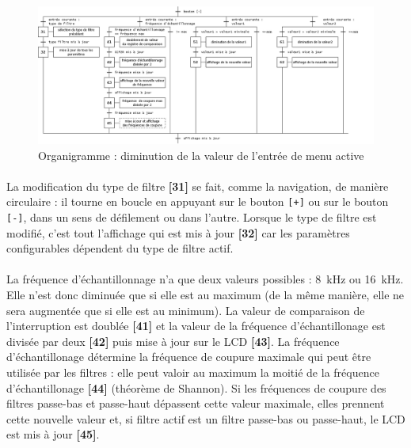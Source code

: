 \documentclass{article}
\begin{document}
    \begin{figure}[H]
        \centering
        \includegraphics[width=\textwidth]{./images/orga_decrease.png}
        \caption{Organigramme : diminution de la valeur de l'entrée de menu active}
    \end{figure}

    \paragraph{}
    La modification du type de filtre \textbf{[31]} se fait, comme la navigation, de manière circulaire : il tourne en boucle en appuyant sur le bouton \texttt{[+]} ou sur le bouton \texttt{[-]}, dans un sens de défilement ou dans l'autre. Lorsque le type de filtre est modifié, c'est tout l'affichage qui est mis à jour \textbf{[32]} car les paramètres configurables dépendent du type de filtre actif.

    \paragraph{}
    La fréquence d'échantillonnage n'a que deux valeurs possibles : \SI{8}{\kilo\hertz} ou \SI{16}{\kilo\hertz}. Elle n'est donc diminuée que si elle est au maximum (de la même manière, elle ne sera augmentée que si elle est au minimum). La valeur de comparaison de l'interruption est doublée \textbf{[41]} et la valeur de la fréquence d'échantillonage est divisée par deux \textbf{[42]} puis mise à jour sur le LCD \textbf{[43]}. La fréquence d'échantillonage détermine la fréquence de coupure maximale qui peut être utilisée par les filtres : elle peut valoir au maximum la moitié de la fréquence d'échantillonage \textbf{[44]} (théorème de Shannon). Si les fréquences de coupure des filtres passe-bas et passe-haut dépassent cette valeur maximale, elles prennent cette nouvelle valeur et, si filtre actif est un filtre passe-bas ou passe-haut, le LCD est mis à jour \textbf{[45]}.
\end{document}

